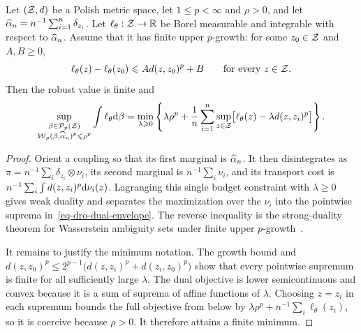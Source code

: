\begin{prop}\label{prop-empirical-wasserstein-dro-duality}
	Let $(\mathcal{Z},d)$ be a Polish metric space, let $1\leq p<\infty$ and $\rho>0$, and let $\widehat{\alpha}_n=n^{-1}\sum_{i=1}^n\delta_{z_i}$. Let $\ell_\theta:\mathcal{Z}\to\mathbb{R}$ be Borel measurable and integrable with respect to $\widehat{\alpha}_n$. Assume that it has finite upper $p$-growth: for some $z_0\in\mathcal{Z}$ and $A,B\geq0$,
	\[
		\ell_\theta(z)-\ell_\theta(z_0)
		\leqslant A d(z,z_0)^p+B
		\qquad\text{for every }z\in\mathcal{Z}.
	\]
	Then the robust value is finite and
	\begin{equation}\label{eq-dro-dual-envelope}
		\sup_{\substack{\beta\in\mathcal{P}_p(\mathcal{Z})\\\operatorname{\mathcal{W}}_p(\beta,\widehat{\alpha}_n)^p\leqslant \rho^p}}
		\int \ell_\theta\mathrm{d}\beta
		=
		\min_{\lambda\geqslant0}
		\left\{
		\lambda\rho^p
		+
		\frac1n\sum_{i=1}^n
		\sup_{z\in\mathcal{Z}}\bigl[\ell_\theta(z)-\lambda d(z,z_i)^p\bigr]
		\right\}.
	\end{equation}
\end{prop}
\begin{proof}
	Orient a coupling so that its first marginal is $\widehat{\alpha}_n$. It then disintegrates as $\pi=n^{-1}\sum_i\delta_{z_i}\otimes\nu_i$, its second marginal is $n^{-1}\sum_i\nu_i$, and its transport cost is $n^{-1}\sum_i\int d(z,z_i)^p\mathrm{d}\nu_i(z)$. Lagranging this single budget constraint with $\lambda\geq0$ gives weak duality and separates the maximization over the $\nu_i$ into the pointwise suprema in~\eqref{eq-dro-dual-envelope}. The reverse inequality is the strong-duality theorem for Wasserstein ambiguity sets under finite upper $p$-growth~\cite{GaoKleywegt2016}.

	It remains to justify the minimum notation. The growth bound and
	$d(z,z_0)^p\leq2^{p-1}\bigl(d(z,z_i)^p+d(z_i,z_0)^p\bigr)$ show that every pointwise supremum is finite for all sufficiently large $\lambda$. The dual objective is lower semicontinuous and convex because it is a sum of suprema of affine functions of $\lambda$. Choosing $z=z_i$ in each supremum bounds the full objective from below by
	$\lambda\rho^p+n^{-1}\sum_i\ell_\theta(z_i)$, so it is coercive because $\rho>0$. It therefore attains a finite minimum.
\end{proof}

